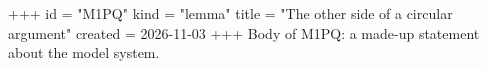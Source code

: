 +++
id = "M1PQ"
kind = "lemma"
title = "The other side of a circular argument"
created = 2026-11-03
+++
Body of M1PQ: a made-up statement about the model system.
